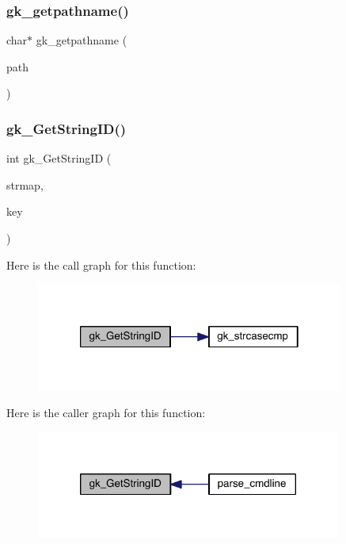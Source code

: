 \subsubsection{\texorpdfstring{gk\+\_\+getpathname()}{gk\_getpathname()}}
{\footnotesize\ttfamily char$\ast$ gk\+\_\+getpathname (\begin{DoxyParamCaption}\item[{char $\ast$}]{path }\end{DoxyParamCaption})}

\mbox{\label{a00077_acd02cb328067e37baaeff8c7d887dc10}} 
\subsubsection{\texorpdfstring{gk\+\_\+\+Get\+String\+I\+D()}{gk\_GetStringID()}}
{\footnotesize\ttfamily int gk\+\_\+\+Get\+String\+ID (\begin{DoxyParamCaption}\item[{\hyperlink{a00646}{gk\+\_\+\+String\+Map\+\_\+t} $\ast$}]{strmap,  }\item[{char $\ast$}]{key }\end{DoxyParamCaption})}

Here is the call graph for this function\+:\nopagebreak
\begin{figure}[H]
\begin{center}
\leavevmode
\includegraphics[width=286pt]{a00077_acd02cb328067e37baaeff8c7d887dc10_cgraph}
\end{center}
\end{figure}
Here is the caller graph for this function\+:\nopagebreak
\begin{figure}[H]
\begin{center}
\leavevmode
\includegraphics[width=284pt]{a00077_acd02cb328067e37baaeff8c7d887dc10_icgraph}
\end{center}
\end{figure}
\mbox{\label{a00077_a3777d3929aad6ae5e17b76656cd6797b}} 
